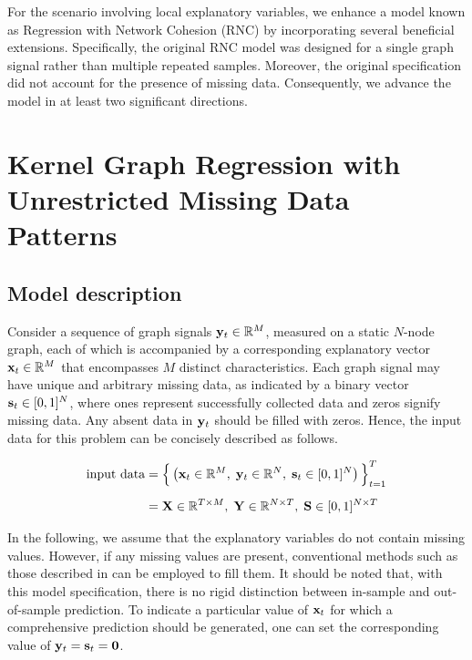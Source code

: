 For the scenario involving local explanatory variables, we enhance a model known as Regression with Network Cohesion (RNC) \citep{Li2019,Le2022} by incorporating several beneficial extensions. Specifically, the original RNC model was designed for a single graph signal rather than multiple repeated samples. Moreover, the original specification did not account for the presence of missing data. Consequently, we advance the model in at least two significant directions.

\section{Kernel Graph Regression with Unrestricted Missing Data Patterns}

\label{sec:kgr_mdp}

\subsection{Model description}

\label{sec:kgr_model_desc}

Consider a sequence of graph signals $\mathbf{y}_t \in \mathbb{R}^M$, measured on a static $N$-node graph, each of which is accompanied by a corresponding explanatory vector $\mathbf{x}_t \in \mathbb{R}^M$ that encompasses $M$ distinct characteristics. Each graph signal may have unique and arbitrary missing data, as indicated by a binary vector $\mathbf{s}_t \in [0, 1]^N$, where ones represent successfully collected data and zeros signify missing data. Any absent data in $\mathbf{y}_t$ should be filled with zeros. Hence, the input data for this problem can be concisely described as follows. 


\begin{align*}
    \text{input data} &= \Big\{\left(\mathbf{x}_t \in \mathbb{R}^{M}, \; \mathbf{y}_t \in \mathbb{R}^{N}, \; \mathbf{s}_t \in [0, 1]^{N} \right)\Big\}_{t=1}^T \\[0.2cm]
    &= \mathbf{X} \in \mathbb{R}^{T \times M}, \; \mathbf{Y} \in \mathbb{R}^{N \times T}, \; \mathbf{S} \in [0, 1]^{N \times T}
\end{align*}

 In the following, we assume that the explanatory variables do not contain missing values. However, if any missing values are present, conventional methods such as those described in \cite{Little2019} can be employed to fill them. It should be noted that, with this model specification, there is no rigid distinction between in-sample and out-of-sample prediction. To indicate a particular value of $\mathbf{x}_t$ for which a comprehensive prediction should be generated, one can set the corresponding value of $\mathbf{y}_t = \mathbf{s}_t = \mathbf{0}$. 

